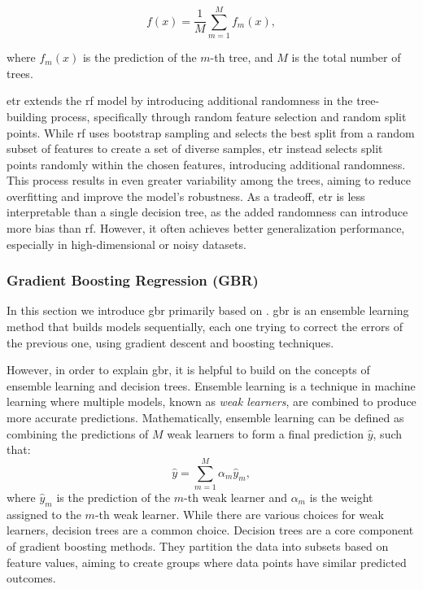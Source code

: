$$
f(x) = \frac{1}{M} \sum_{m=1}^{M} f_m(x),
$$

where $f_m(x)$ is the prediction of the $m$-th tree, and $M$ is the total number of trees.

\gls{etr} extends the \gls{rf} model by introducing additional randomness in the tree-building process, specifically through random feature selection and random split points.
While \gls{rf} uses bootstrap sampling and selects the best split from a random subset of features to create a set of diverse samples, \gls{etr} instead selects split points randomly within the chosen features, introducing additional randomness.
This process results in even greater variability among the trees, aiming to reduce overfitting and improve the model's robustness.
As a tradeoff, \gls{etr} is less interpretable than a single decision tree, as the added randomness can introduce more bias than \gls{rf}.
However, it often achieves better generalization performance, especially in high-dimensional or noisy datasets.

\subsubsection{Gradient Boosting Regression (GBR)}\label{sec:gradientboost}
In this section we introduce \gls{gbr} primarily based on \citet{James2023AnIS}.
\gls{gbr} is an ensemble learning method that builds models sequentially, each one trying to correct the errors of the previous one, using gradient descent and boosting techniques.

However, in order to explain \gls{gbr}, it is helpful to build on the concepts of ensemble learning and decision trees.
Ensemble learning is a technique in machine learning where multiple models, known as \textit{weak learners}, are combined to produce more accurate predictions.
Mathematically, ensemble learning can be defined as combining the predictions of $M$ weak learners to form a final prediction $\hat{y}$, such that:
\begin{equation}
    \hat{y} = \sum_{m=1}^{M} \alpha_m \hat{y}_m,
\end{equation}
where $\hat{y}_m$ is the prediction of the $m$-th weak learner and $\alpha_m$ is the weight assigned to the $m$-th weak learner.
While there are various choices for weak learners, decision trees are a common choice.
Decision trees are a core component of gradient boosting methods. 
They partition the data into subsets based on feature values, aiming to create groups where data points have similar predicted outcomes. 

